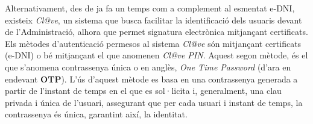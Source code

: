 \newline Alternativament, des de ja fa un temps com a complement al esmentat e-DNI, existeix \textit{Cl@ve}, un sistema que busca facilitar la identificació dels usuaris devant de l'Administració, alhora que permet signatura electrònica mitjançant certificats.\\
\newline Els mètodes d'autenticació permesos al sistema \textit{Cl@ve} són mitjançant certificats (e-DNI) o bé mitjançant el que anomenen \textit{Cl@ve PIN}.
\newline Aquest segon mètode, és el que s'anomena contrassenya única o en anglès, \textit{One Time Password} (d'ara en endevant \textbf{OTP}). L'ús d'aquest mètode es basa en una contrassenya generada a partir de l'instant de temps en el que es sol·licita i, generalment, una clau privada i única de l'usuari, assegurant que per cada usuari i instant de temps, la contrassenya és única, garantint així, la identitat.























